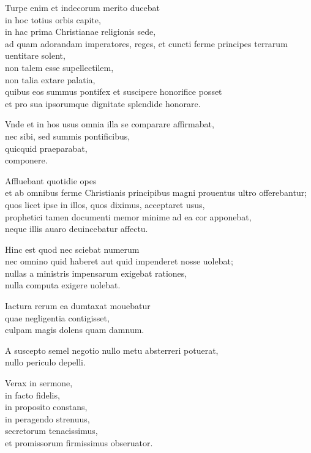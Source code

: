\documentclass[a5paper,twoside]{article}
\begin{document}
Turpe enim et indecorum merito ducebat \\
in hoc totius orbis capite, \\
in hac prima Christianae religionis sede, \\
ad quam adorandam imperatores, reges, et cuncti ferme principes terrarum uentitare solent, \\
non talem esse supellectilem, \\
non talia extare palatia, \\
quibus eos summus pontifex et suscipere honorifice posset \\
et pro sua ipsorumque dignitate splendide honorare. 

Vnde et in hos usus omnia illa se comparare affirmabat, \\
nec sibi, sed summis pontificibus, \\
quicquid praeparabat, \\
componere. 

Affluebant quotidie opes \\
et ab omnibus ferme Christianis principibus magni prouentus ultro offerebantur; \\
quos licet ipse in illos, quos diximus, acceptaret usus, \\
prophetici tamen documenti memor minime ad ea cor apponebat, \\
neque illis auaro deuincebatur affectu. 

Hinc est quod nec sciebat numerum \\
nec omnino quid haberet aut quid impenderet nosse uolebat; \\
nullas a ministris impensarum exigebat rationes, \\
nulla computa exigere uolebat. 

Iactura rerum ea dumtaxat mouebatur \\
quae negligentia contigisset, \\
culpam magis dolens quam damnum. 

A suscepto semel negotio nullo metu absterreri potuerat, \\
nullo periculo depelli. 

Verax in sermone, \\
in facto fidelis, \\
in proposito constans, \\
in peragendo strenuus, \\
secretorum tenacissimus, \\
et promissorum firmissimus obseruator. 
\end{document}
